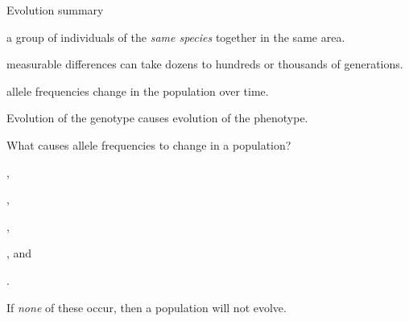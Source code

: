 \documentclass[t]{beamer}
\begin{document}
\begin{frame}[t]{Evolution summary}

	\hangpara {} a group of individuals of the \emph{same species} together in the same area.
	
	\pause\hangpara {} measurable differences can take dozens to hundreds or thousands of generations.
	
	\pause\hangpara {} allele frequencies change in the population over time.
	
	\pause\hangpara Evolution of the genotype causes evolution of the phenotype.

\end{frame}
%
\begin{frame}[t]{What causes allele frequencies to change in a population?}

	\hangpara {},
	
	\hangpara {},
	
	\hangpara {},

	\hangpara {}, and
	
	\hangpara {}.

	\hangpara If \emph{none} of these occur, then a population will not evolve. 
	
\end{frame}
\end{document}
